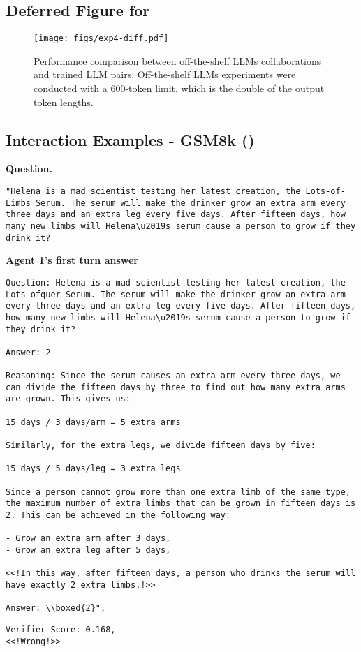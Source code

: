 \subsection{Deferred Figure for  }
\begin{figure}[h]
\centering
\texttt{[image: figs/exp4-diff.pdf]}
\caption{Performance comparison between off-the-shelf LLMs collaborations and \oursspace trained LLM pairs. Off-the-shelf LLMs experiments were conducted with a 600-token limit, which is the double of the \oursspace output token lengths.}
\label{fig:turn-performance-diff}
\end{figure}

\clearpage
\subsection{Interaction Examples - GSM8k  ()}
\textbf{Question. }
\begin{lstlisting}
"Helena is a mad scientist testing her latest creation, the Lots-of-Limbs Serum. The serum will make the drinker grow an extra arm every three days and an extra leg every five days. After fifteen days, how many new limbs will Helena\u2019s serum cause a person to grow if they drink it?
\end{lstlisting}
\textbf{Agent 1's first turn answer} 
\begin{lstlisting}
Question: Helena is a mad scientist testing her latest creation, the Lots-ofquer Serum. The serum will make the drinker grow an extra arm every three days and an extra leg every five days. After fifteen days, how many new limbs will Helena\u2019s serum cause a person to grow if they drink it?

Answer: 2

Reasoning: Since the serum causes an extra arm every three days, we can divide the fifteen days by three to find out how many extra arms are grown. This gives us:

15 days / 3 days/arm = 5 extra arms

Similarly, for the extra legs, we divide fifteen days by five:

15 days / 5 days/leg = 3 extra legs

Since a person cannot grow more than one extra limb of the same type, the maximum number of extra limbs that can be grown in fifteen days is 2. This can be achieved in the following way:

- Grow an extra arm after 3 days,
- Grow an extra leg after 5 days,

<<!In this way, after fifteen days, a person who drinks the serum will have exactly 2 extra limbs.!>>

Answer: \\boxed{2}",

\end{lstlisting}
\begin{lstlisting}
Verifier Score: 0.168,
<<!Wrong!>> 
\end{lstlisting}

